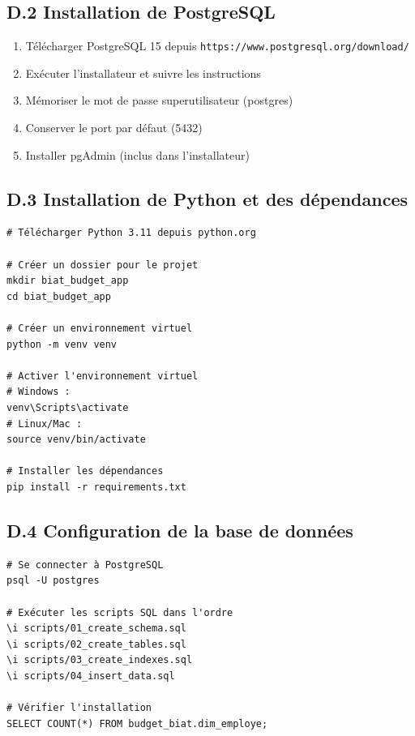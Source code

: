 \subsection*{D.2 Installation de PostgreSQL}

\begin{enumerate}
    \item Télécharger PostgreSQL 15 depuis \texttt{https://www.postgresql.org/download/}
    \item Exécuter l'installateur et suivre les instructions
    \item Mémoriser le mot de passe superutilisateur (postgres)
    \item Conserver le port par défaut (5432)
    \item Installer pgAdmin (inclus dans l'installateur)
\end{enumerate}

\subsection*{D.3 Installation de Python et des dépendances}

\begin{verbatim}
# Télécharger Python 3.11 depuis python.org

# Créer un dossier pour le projet
mkdir biat_budget_app
cd biat_budget_app

# Créer un environnement virtuel
python -m venv venv

# Activer l'environnement virtuel
# Windows :
venv\Scripts\activate
# Linux/Mac :
source venv/bin/activate

# Installer les dépendances
pip install -r requirements.txt
\end{verbatim}

\subsection*{D.4 Configuration de la base de données}

\begin{verbatim}
# Se connecter à PostgreSQL
psql -U postgres

# Exécuter les scripts SQL dans l'ordre
\i scripts/01_create_schema.sql
\i scripts/02_create_tables.sql
\i scripts/03_create_indexes.sql
\i scripts/04_insert_data.sql

# Vérifier l'installation
SELECT COUNT(*) FROM budget_biat.dim_employe;
\end{verbatim}


